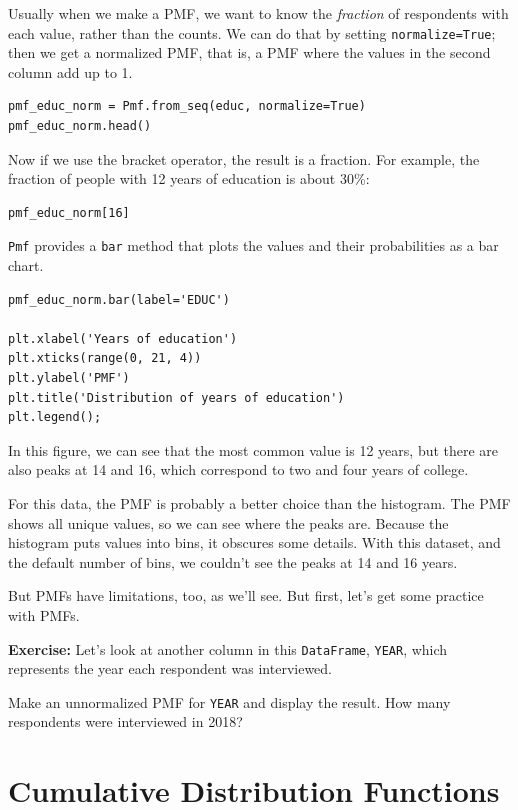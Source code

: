 Usually when we make a PMF, we want to know the \emph{fraction} of
respondents with each value, rather than the counts. We can do that by
setting \passthrough{\lstinline!normalize=True!}; then we get a
normalized PMF, that is, a PMF where the values in the second column add
up to 1.

\begin{lstlisting}[]
pmf_educ_norm = Pmf.from_seq(educ, normalize=True)
pmf_educ_norm.head()
\end{lstlisting}

Now if we use the bracket operator, the result is a fraction. For
example, the fraction of people with 12 years of education is about
30\%:

\begin{lstlisting}[]
pmf_educ_norm[16]
\end{lstlisting}

\passthrough{\lstinline!Pmf!} provides a \passthrough{\lstinline!bar!}
method that plots the values and their probabilities as a bar chart.

\begin{lstlisting}[]
pmf_educ_norm.bar(label='EDUC')

plt.xlabel('Years of education')
plt.xticks(range(0, 21, 4))
plt.ylabel('PMF')
plt.title('Distribution of years of education')
plt.legend();
\end{lstlisting}

In this figure, we can see that the most common value is 12 years, but
there are also peaks at 14 and 16, which correspond to two and four
years of college.

For this data, the PMF is probably a better choice than the histogram.
The PMF shows all unique values, so we can see where the peaks are.
Because the histogram puts values into bins, it obscures some details.
With this dataset, and the default number of bins, we couldn't see the
peaks at 14 and 16 years.

But PMFs have limitations, too, as we'll see. But first, let's get some
practice with PMFs.

\textbf{Exercise:} Let's look at another column in this
\passthrough{\lstinline!DataFrame!}, \passthrough{\lstinline!YEAR!},
which represents the year each respondent was interviewed.

Make an unnormalized PMF for \passthrough{\lstinline!YEAR!} and display
the result. How many respondents were interviewed in 2018?

\hypertarget{cumulative-distribution-functions}{%
\section{Cumulative Distribution
Functions}\label{cumulative-distribution-functions}}

